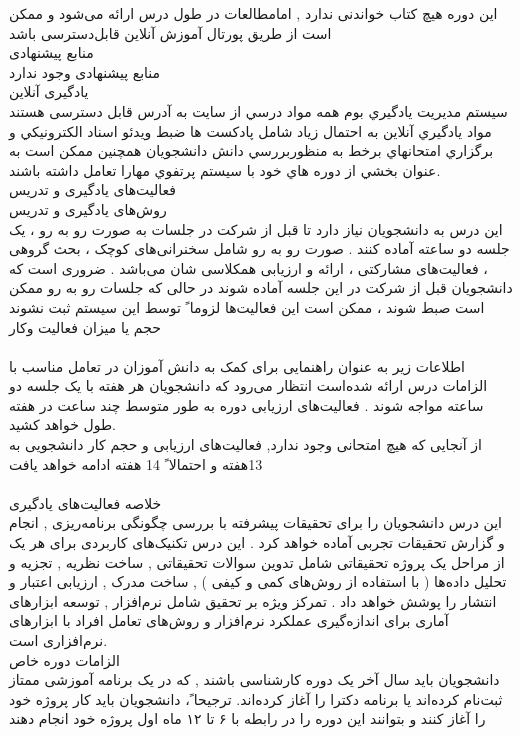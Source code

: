 \documentclass[a4 paper,12pt]{article}\usepackage{float, graphicx,xepersian }
\begin{document}
این دوره هیچ کتاب خواندنی ندارد , امامطالعات در طول درس ارائه می‌شود و ممکن است از طریق پورتال آموزش آنلاین قابل‌دسترسی باشد \\
منابع پیشنهادی\\
منابع پیشنهادی وجود ندارد\\
یادگیری آنلاین\\
سيستم مديريت يادگيري بوم همه مواد درسي از سايت  
به آدرس 
\noindent
{}
 قابل دسترسی هستند مواد يادگيري آنلاين به احتمال زياد شامل پادكست ها ضبط ويدئو اسناد الكترونيكي و برگزاري امتحانهاي برخط به منظوربررسي دانش دانشجويان همچنين ممكن است به عنوان بخشي از دوره هاي خود با سيستم پرتفوي مهارا تعامل داشته باشند.  \\
 فعالیت‌های یادگیری و تدریس \\
 روش‌های یادگیری و تدریس \\
 این درس به دانشجویان نیاز دارد تا قبل از شرکت در جلسات به صورت رو به رو ، یک جلسه دو ساعته آماده کنند . صورت رو به رو شامل سخنرانی‌های کوچک ، بحث گروهی ، فعالیت‌های مشارکتی ، ارائه و ارزیابی همکلاسی شان می‌باشد . ضروری است که دانشجویان قبل از شرکت در این جلسه آماده شوند در حالی که جلسات رو به رو ممکن است صبط شوند ، ممکن است این فعالیت‌ها لزوما ً توسط این سیستم ثبت نشوند\\
 
\noindent 
 حجم یا میزان فعالیت وکار\\
 \\
 اطلاعات زیر به عنوان راهنمایی برای کمک به دانش آموزان در تعامل مناسب با الزامات درس ارائه شده‌است 
 انتظار می‌رود که دانشجویان هر هفته با یک جلسه دو ساعته مواجه شوند . فعالیت‌های ارزیابی دوره به طور متوسط چند ساعت در هفته طول خواهد کشید.\\
 از آنجایی که هیچ امتحانی وجود ندارد, فعالیت‌های ارزیابی و حجم کار دانشجویی به 13هفته و احتمالا ً 14 هفته ادامه خواهد یافت\\
 \\
 خلاصه فعالیت‌های یادگیری\\
 این درس دانشجویان را برای تحقیقات پیشرفته با بررسی چگونگی برنامه‌ریزی , انجام و گزارش تحقیقات تجربی آماده خواهد کرد . این درس تکنیک‌های کاربردی برای هر یک از مراحل یک پروژه تحقیقاتی شامل تدوین سوالات تحقیقاتی , ساخت نظریه , تجزیه و تحلیل داده‌ها ( با استفاده از روش‌های کمی و کیفی ) , ساخت مدرک , ارزیابی اعتبار و انتشار را پوشش خواهد داد . تمرکز ویژه بر تحقیق شامل نرم‌افزار , توسعه ابزارهای آماری برای اندازه‌گیری عملکرد نرم‌افزار و روش‌های تعامل افراد با ابزارهای نرم‌افزاری است. \\
 الزامات دوره خاص\\
 دانشجویان باید سال آخر یک دوره کارشناسی باشند , که در یک برنامه آموزشی ممتاز ثبت‌نام کرده‌اند یا برنامه دکترا را آغاز کرده‌اند. ترجیحا ً، دانشجویان باید کار پروژه خود را آغاز کنند و بتوانند این دوره را در رابطه با ۶ تا ۱۲ ماه اول پروژه خود انجام دهند\\
 
\end{document}
